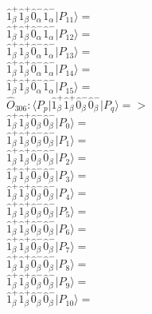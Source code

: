 \documentclass[14pt]{article}
\begin{document}
    $ \hat{1}_{\beta}^{+}\hat{1}_{\beta}^{+}\hat{0}_{\alpha}^{-}\hat{1}_{\alpha}^{-} \vert{P_{11}}\rangle =  $ \\ 
    $ \hat{1}_{\beta}^{+}\hat{1}_{\beta}^{+}\hat{0}_{\alpha}^{-}\hat{1}_{\alpha}^{-} \vert{P_{12}}\rangle =  $ \\ 
    $ \hat{1}_{\beta}^{+}\hat{1}_{\beta}^{+}\hat{0}_{\alpha}^{-}\hat{1}_{\alpha}^{-} \vert{P_{13}}\rangle =  $ \\ 
    $ \hat{1}_{\beta}^{+}\hat{1}_{\beta}^{+}\hat{0}_{\alpha}^{-}\hat{1}_{\alpha}^{-} \vert{P_{14}}\rangle =  $ \\ 
    $ \hat{1}_{\beta}^{+}\hat{1}_{\beta}^{+}\hat{0}_{\alpha}^{-}\hat{1}_{\alpha}^{-} \vert{P_{15}}\rangle =  $ \\ 
    
    $\hat{O}_{306}:  \langle{P_p}\vert \hat{1}_{\beta}^{+}\hat{1}_{\beta}^{+}\hat{0}_{\beta}^{-}\hat{0}_{\beta}^{-} \vert{P_q}\rangle => $ \\ 
    $ \hat{1}_{\beta}^{+}\hat{1}_{\beta}^{+}\hat{0}_{\beta}^{-}\hat{0}_{\beta}^{-} \vert{P_{0}}\rangle =  $ \\ 
    $ \hat{1}_{\beta}^{+}\hat{1}_{\beta}^{+}\hat{0}_{\beta}^{-}\hat{0}_{\beta}^{-} \vert{P_{1}}\rangle =  $ \\ 
    $ \hat{1}_{\beta}^{+}\hat{1}_{\beta}^{+}\hat{0}_{\beta}^{-}\hat{0}_{\beta}^{-} \vert{P_{2}}\rangle =  $ \\ 
    $ \hat{1}_{\beta}^{+}\hat{1}_{\beta}^{+}\hat{0}_{\beta}^{-}\hat{0}_{\beta}^{-} \vert{P_{3}}\rangle =  $ \\ 
    $ \hat{1}_{\beta}^{+}\hat{1}_{\beta}^{+}\hat{0}_{\beta}^{-}\hat{0}_{\beta}^{-} \vert{P_{4}}\rangle =  $ \\ 
    $ \hat{1}_{\beta}^{+}\hat{1}_{\beta}^{+}\hat{0}_{\beta}^{-}\hat{0}_{\beta}^{-} \vert{P_{5}}\rangle =  $ \\ 
    $ \hat{1}_{\beta}^{+}\hat{1}_{\beta}^{+}\hat{0}_{\beta}^{-}\hat{0}_{\beta}^{-} \vert{P_{6}}\rangle =  $ \\ 
    $ \hat{1}_{\beta}^{+}\hat{1}_{\beta}^{+}\hat{0}_{\beta}^{-}\hat{0}_{\beta}^{-} \vert{P_{7}}\rangle =  $ \\ 
    $ \hat{1}_{\beta}^{+}\hat{1}_{\beta}^{+}\hat{0}_{\beta}^{-}\hat{0}_{\beta}^{-} \vert{P_{8}}\rangle =  $ \\ 
    $ \hat{1}_{\beta}^{+}\hat{1}_{\beta}^{+}\hat{0}_{\beta}^{-}\hat{0}_{\beta}^{-} \vert{P_{9}}\rangle =  $ \\ 
    $ \hat{1}_{\beta}^{+}\hat{1}_{\beta}^{+}\hat{0}_{\beta}^{-}\hat{0}_{\beta}^{-} \vert{P_{10}}\rangle =  $ \\ 
\end{document}
